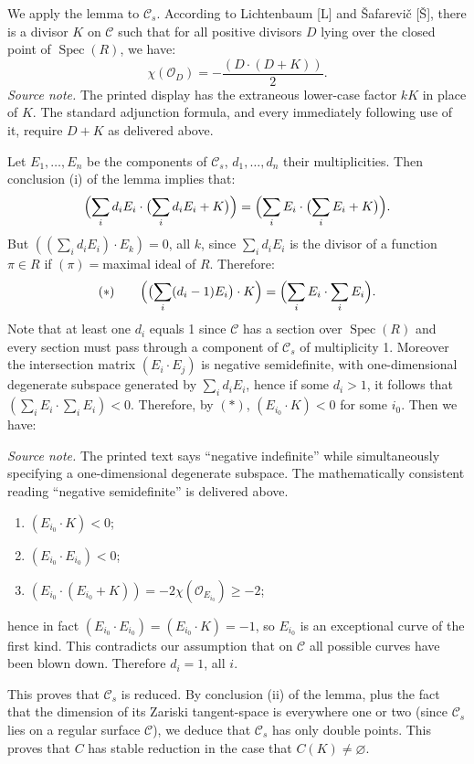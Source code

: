 \documentclass[10pt]{article}
\newcommand{\Spec}{\operatorname{Spec}}
\newcommand{\cO}{\mathcal O}
\begin{document}
We apply the lemma to $\mathscr C_s$. According to Lichtenbaum [L] and \v{S}afarevi\v{c} [\v{S}], there is a divisor $K$ on $\mathscr C$ such that for all positive divisors $D$ lying over the closed point of $\Spec(R)$, we have:
\[
\chi(\cO_D)=-\frac{(D\cdot(D+K))}{2}.
\]
\noindent\emph{Source note.} The printed display has the extraneous lower-case factor $kK$ in place of $K$. The standard adjunction formula, and every immediately following use of it, require $D+K$ as delivered above.

Let $E_1,\ldots,E_n$ be the components of $\mathscr C_s$, $d_1,\ldots,d_n$ their multiplicities. Then conclusion (i) of the lemma implies that:
\[
\Bigl(\sum_i d_iE_i\cdot\bigl(\sum_i d_iE_i+K\bigr)\Bigr)=
\Bigl(\sum_i E_i\cdot\bigl(\sum_i E_i+K\bigr)\Bigr).
\]
But $((\sum_i d_iE_i)\cdot E_k)=0$, all $k$, since $\sum_i d_iE_i$ is the divisor of a function $\pi\in R$ if $(\pi)={}$maximal ideal of $R$. Therefore:
\[
(*)\qquad \Bigl(\bigl(\sum_i(d_i-1)E_i\bigr)\cdot K\Bigr)=\Bigl(\sum_i E_i\cdot\sum_i E_i\Bigr).
\]
Note that at least one $d_i$ equals 1 since $\mathscr C$ has a section over $\Spec(R)$ and every section must pass through a component of $\mathscr C_s$ of multiplicity 1. Moreover the intersection matrix $(E_i\cdot E_j)$ is negative semidefinite, with one-dimensional degenerate subspace generated by $\sum_i d_iE_i$, hence if some $d_i>1$, it follows that $(\sum_i E_i\cdot\sum_i E_i)<0$. Therefore, by $(*)$, $(E_{i_0}\cdot K)<0$ for some $i_0$. Then we have:

\noindent\emph{Source note.} The printed text says ``negative indefinite'' while simultaneously specifying a one-dimensional degenerate subspace. The mathematically consistent reading ``negative semidefinite'' is delivered above.
\begin{enumerate}[label=\emph{\alph*)}]
\item $(E_{i_0}\cdot K)<0$;
\item $(E_{i_0}\cdot E_{i_0})<0$;
\item $(E_{i_0}\cdot(E_{i_0}+K))=-2\chi(\cO_{E_{i_0}})\geq -2$;
\end{enumerate}
hence in fact $(E_{i_0}\cdot E_{i_0})=(E_{i_0}\cdot K)=-1$, so $E_{i_0}$ is an exceptional curve of the first kind. This contradicts our assumption that on $\mathscr C$ all possible curves have been blown down. Therefore $d_i=1$, all $i$.

This proves that $\mathscr C_s$ is reduced. By conclusion (ii) of the lemma, plus the fact that the dimension of its Zariski tangent-space is everywhere one or two (since $\mathscr C_s$ lies on a regular surface $\mathscr C$), we deduce that $\mathscr C_s$ has only double points. This proves that $C$ has stable reduction in the case that $C(K)\ne\varnothing$.
\end{document}
